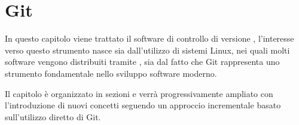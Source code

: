 %
%
\chapter{Git}
\label{chapter:git}
In questo capitolo viene trattato il software di controllo di versione , l'interesse verso questo strumento nasce sia dall'utilizzo di sistemi Linux, nei quali molti software vengono distribuiti tramite , sia dal fatto che Git rappresenta uno strumento fondamentale nello sviluppo software moderno.

Il capitolo è organizzato in sezioni e verrà progressivamente ampliato con l'introduzione di nuovi concetti seguendo un approccio incrementale basato sull'utilizzo diretto di Git.

